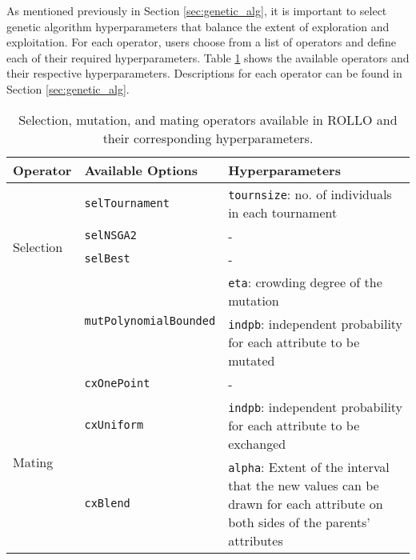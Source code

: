 As mentioned previously in Section \ref{sec:genetic_alg}, it is important to 
select genetic algorithm hyperparameters that balance the extent of exploration 
and exploitation.
For each operator, users choose from a list of operators and define each
of their required hyperparameters. 
Table \ref{tab:deap_operators} shows the available operators and their respective 
hyperparameters. 
Descriptions for each operator can be found in Section \ref{sec:genetic_alg}.
\begin{table}[htbp]
    \centering
    \onehalfspacing
    \caption{Selection, mutation, and mating operators available in 
    \acrfull{ROLLO} and their corresponding hyperparameters. }
	\label{tab:deap_operators}
    \footnotesize
    \begin{tabular}{l|p{}|p{}}
    \hline
    \textbf{Operator} & \textbf{Available Options} & \textbf{Hyperparameters} \\ \hline
    \multirow{4}{1cm}{Selection} & \texttt{selTournament} & \texttt{tournsize}: no. of individuals in each tournament\\ \cline{2-3}
    & \texttt{selNSGA2} & - \\ \cline{2-3}
    & \texttt{selBest} & - \\ \hline
    \multirow{2}{1cm}{Mutation} & \multirow{2}{2cm}{\texttt{mutPolynomialBounded}} & \texttt{eta}: crowding degree of the mutation\\  
    && \texttt{indpb}: independent probability for each attribute to be mutated\\ \hline
    \multirow{3}{1cm}{Mating} & \texttt{cxOnePoint} & -\\ \cline{2-3}
    & \texttt{cxUniform} & \texttt{indpb}: independent probability for each attribute to be exchanged\\ \cline{2-3}
    & \texttt{cxBlend} & \texttt{alpha}: Extent of the interval that the new values can be drawn for each attribute on both sides of the parents’ attributes\\ \hline
    \end{tabular}
    \end{table}

